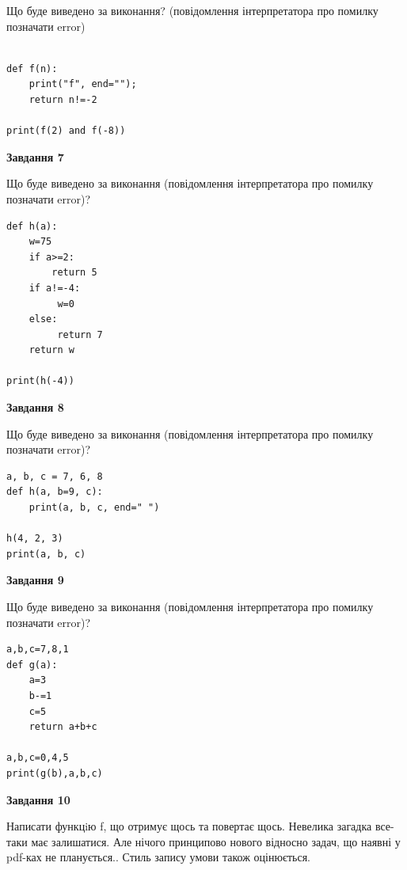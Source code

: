 \documentclass[12pt, ukrainian]{article}
\begin{document}
{\begin {large}
Що буде виведено за виконання? (повідомлення інтерпретатора про помилку позначати error)\par
\begin{verbatim}

def f(n):
    print("f", end="");
    return n!=-2

print(f(2) and f(-8))
\end{verbatim}

{\begin {center}\textbf{Завдання 7}\end {center}}

Що буде виведено за виконання (повідомлення інтерпретатора про помилку позначати error)?\par
\begin{verbatim}
def h(a):
    w=75
    if a>=2: 
        return 5
    if a!=-4:
         w=0
    else:
         return 7
    return w

print(h(-4))
\end{verbatim}

{\begin {center}\textbf{Завдання 8}\end {center}}

Що буде виведено за виконання (повідомлення інтерпретатора про помилку позначати error)?\par
\begin{verbatim}
a, b, c = 7, 6, 8
def h(a, b=9, c):
    print(a, b, c, end=" ")

h(4, 2, 3)
print(a, b, c)
\end{verbatim}

{\begin {center}\textbf{Завдання 9}\end {center}}

Що буде виведено за виконання (повідомлення інтерпретатора про помилку позначати error)?\par
\begin{verbatim}
a,b,c=7,8,1
def g(a):
    a=3
    b-=1
    c=5
    return a+b+c

a,b,c=0,4,5
print(g(b),a,b,c)
\end{verbatim}

{\begin {center}\textbf{Завдання 10}\end {center}}


Написати функцiю f, що отримує щось та повертає щось. Невелика загадка все-таки має залишатися. Але нічого принципово нового відносно задач, що наявні у pdf-ках не планується.. Стиль запису умови також оцінюється.\par
\end {large}}
\newpage
\end{document}
